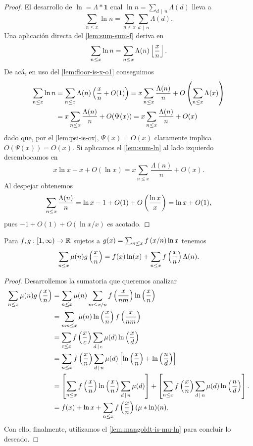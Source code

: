 \begin{proof}
  El desarrollo de \(\ln = \Lambda * \textbf{1}\)
  cual \(\ln n = \sum_{d \, \mid \, n} \Lambda(d)\)
  lleva a
  \[
    \sum_{n \leq x} \ln n = \sum_{n \leq x} \sum_{d \, \mid \, n} \Lambda(d).
  \]
  Una aplicaci\'on directa del \cref{lem:sum-sum-f} deriva en
  \[
    \sum_{n \leq x} \ln n = \sum_{n \leq x} \Lambda(n) \left\lfloor \frac{x}{n} \right\rfloor.
  \]
  De ac\'a, en uso del \cref{lem:floor-is-x-o1} conseguimos
  \begin{align*}
    \sum_{n \leq x} \ln n &= \sum_{n \leq x} \Lambda(n) \left( \frac{x}{n} + O(1) \right)
    = x \sum_{n \leq x} \frac{\Lambda(n)}{n} + O\left( \sum_{n \leq x} \Lambda(x) \right) \\
    &= x \sum_{n \leq x} \frac{\Lambda(n)}{n} + O(\Psi(x))
    = x \sum_{n \leq x} \frac{\Lambda(n)}{n} + O(x)
  \end{align*}
  dado que, por el \cref{lem:psi-is-ox}, \(\Psi(x) = O(x)\)
  claramente implica \(O(\Psi(x))=O(x)\).
  Si aplicamos el \cref{lem:sum-ln} al lado izquierdo desembocamos en
  \[
    x\ln x - x + O(\ln x) = x \sum_{n \leq x} \frac{\Lambda(n)}{n} + O(x). 
  \]
  Al despejar obtenemos
  \[
    \sum_{n \leq x} \frac{\Lambda(n)}{n}
    = \ln x - 1 + O(1) + O\left( \frac{\ln x}{x} \right)
    = \ln x + O(1),
  \]
  pues
  \(
    -1 + O(1)+ O(\ln x/x)
  \)
  es acotado.
\end{proof}

\begin{lemma}
  \label{lem:sum-mu-g}
  Para \(f, g : [1, \infty) \to \mathbb{R}\)
  sujetos a  \(g(x) = \sum_{n \leq x} f\left( x/n \right) \ln x\) tenemos
  \[
    \sum_{n \leq x} \mu(n) g\left( \frac{x}{n} \right)
    = f(x) \ln(x) + \sum_{n \leq x} f\left( \frac{x}{n} \right) \Lambda(n).
  \]
\end{lemma}

\begin{proof}
  Desarrollemos la sumatoria que queremos analizar
  \begin{align*}
    \sum_{n \leq x} \mu(n) g\left( \frac{x}{n} \right)
    &= \sum_{n \leq x} \mu(n)
    \sum_{m \leq x/n} f\left( \frac{x}{nm} \right) \ln \left( \frac{x}{n} \right) \\
    &= \sum_{nm \leq x} \mu(n) \ln\left( \frac{x}{n} \right) f \left( \frac{x}{nm} \right) \\
    &= \sum_{c \leq x} f\left( \frac{x}{c} \right)
    \sum_{d \, \mid \, c} \mu(d) \ln\left( \frac{x}{d} \right) \\
    &= \sum_{n \leq x} f\left( \frac{x}{n} \right)
    \sum_{d \, \mid \, n} \mu(d)
    \left[ \ln \left( \frac{x}{n} \right) + \ln\left( \frac{n}{d} \right) \right] \\
    &= \left[ \sum_{n \leq x} f\left( \frac{x}{n} \right) \ln\left( \frac{x}{n} \right) \sum_{d \, \mid \, n} \mu(d) \right]
    +  \left[ \sum_{n \leq x} f\left( \frac{x}{n} \right) \sum_{d \, \mid \, n} \mu(d) \ln\left( \frac{n}{d} \right) \right].\\
    &= f(x) + \ln{x} + \sum_{n \leq x} f\left( \frac{x}{n} \right) (\mu * \ln)(n).
  \end{align*}
  Con ello, finalmente, utilizamos el \cref{lem:mangoldt-is-mu-ln} para concluir lo deseado.
\end{proof}

